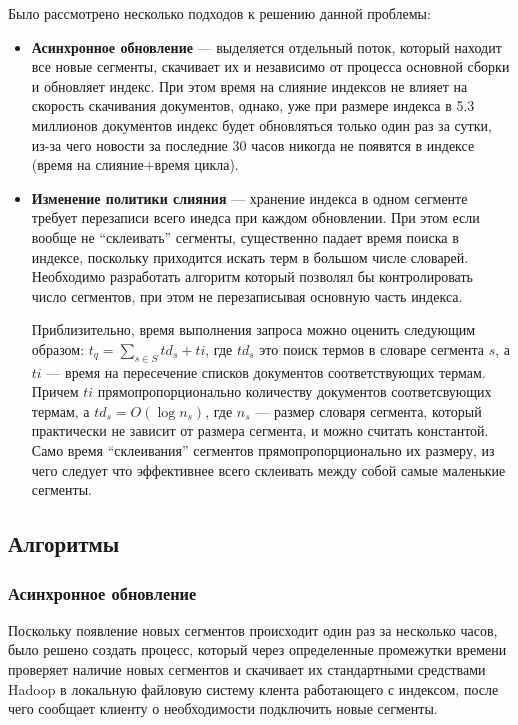 Было рассмотрено несколько подходов к решению данной проблемы:
\begin{itemize}
 \item \textbf{Асинхронное обновление} --- выделяется отдельный поток, который  находит все новые сегменты, скачивает их и независимо от процесса основной сборки и обновляет индекс. При этом время на слияние индексов не влияет на скорость скачивания документов, однако, уже при размере индекса в 5.3 миллионов документов индекс будет обновляться только один раз за сутки, из-за чего новости за последние 30 часов никогда не появятся в индексе (время на слияние+время цикла).
 \item \textbf{Изменение политики слияния} --- хранение индекса в одном сегменте требует перезаписи всего инедса при каждом обновлении. При этом если вообще не ``склеивать'' сегменты, существенно падает время поиска в индексе, поскольку приходится искать терм в большом числе словарей. Необходимо разработать алгоритм который позволял бы контролировать число сегментов, при этом не перезаписывая основную часть индекса.

Приблизительно, время выполнения запроса можно оценить следующим образом: $t_{q} = \sum\limits_{s\in S} td_{s} + ti$, где $td_{s}$ это поиск термов в словаре сегмента $s$, а $ti$ --- время на пересечение списков документов соответствующих термам. Причем $ti$ прямопропорционально количеству документов соответсвующих термам, а $td_{s} = O(\log n_{s})$, где $n_{s}$ --- размер словаря сегмента, который практически не зависит от размера сегмента, и можно считать константой. Само время ``склеивания'' сегментов прямопропорционально их размеру, из чего следует что эффективнее всего склеивать между собой самые маленькие сегменты. 
 
\end{itemize}
\subsection{Алгоритмы}
\subsubsection{Асинхронное обновление}
Поскольку появление новых сегментов происходит один раз за несколько часов, было решено создать процесс, который через определенные промежутки времени проверяет наличие новых сегментов и скачивает их стандартными средствами Hadoop в локальную файловую систему клента работающего с индексом, после чего сообщает клиенту о необходимости подключить новые сегменты.
